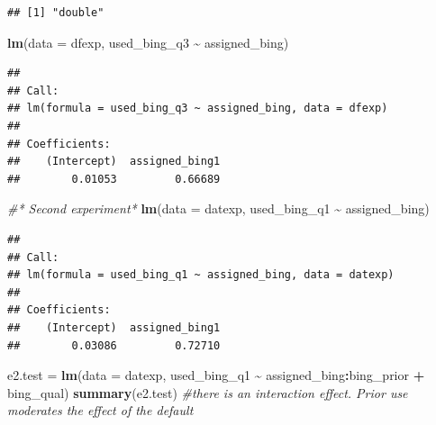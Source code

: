 \documentclass[
  11pt,
]{article}
\newenvironment{Shaded}{\begin{snugshade}}{\end{snugshade}}
\newcommand{\AttributeTok}[1]{\textcolor[rgb]{0.13,0.29,0.53}{#1}}
\newcommand{\CommentTok}[1]{\textcolor[rgb]{0.56,0.35,0.01}{\textit{#1}}}
\newcommand{\FunctionTok}[1]{\textcolor[rgb]{0.13,0.29,0.53}{\textbf{#1}}}
\newcommand{\NormalTok}[1]{#1}
\newcommand{\OtherTok}[1]{\textcolor[rgb]{0.56,0.35,0.01}{#1}}
\newcommand{\SpecialCharTok}[1]{\textcolor[rgb]{0.81,0.36,0.00}{\textbf{#1}}}
\begin{document}
\begin{verbatim}
## [1] "double"
\end{verbatim}

\begin{Shaded}
\begin{Highlighting}[]
\FunctionTok{lm}\NormalTok{(}\AttributeTok{data =}\NormalTok{ dfexp, used\_bing\_q3 }\SpecialCharTok{\textasciitilde{}}\NormalTok{ assigned\_bing)}
\end{Highlighting}
\end{Shaded}

\begin{verbatim}
## 
## Call:
## lm(formula = used_bing_q3 ~ assigned_bing, data = dfexp)
## 
## Coefficients:
##    (Intercept)  assigned_bing1  
##        0.01053         0.66689
\end{verbatim}

\begin{Shaded}
\begin{Highlighting}[]
\CommentTok{\#\textquotesingle{}* Second experiment*}
\FunctionTok{lm}\NormalTok{(}\AttributeTok{data =}\NormalTok{ datexp, used\_bing\_q1 }\SpecialCharTok{\textasciitilde{}}\NormalTok{ assigned\_bing)}
\end{Highlighting}
\end{Shaded}

\begin{verbatim}
## 
## Call:
## lm(formula = used_bing_q1 ~ assigned_bing, data = datexp)
## 
## Coefficients:
##    (Intercept)  assigned_bing1  
##        0.03086         0.72710
\end{verbatim}

\begin{Shaded}
\begin{Highlighting}[]
\NormalTok{e2.test }\OtherTok{=} \FunctionTok{lm}\NormalTok{(}\AttributeTok{data =}\NormalTok{ datexp, used\_bing\_q1 }\SpecialCharTok{\textasciitilde{}}\NormalTok{ assigned\_bing}\SpecialCharTok{:}\NormalTok{bing\_prior }\SpecialCharTok{+}\NormalTok{ bing\_qual)}
\FunctionTok{summary}\NormalTok{(e2.test) }\CommentTok{\#there is an interaction effect. Prior use moderates the effect of the default}
\end{Highlighting}
\end{Shaded}
\end{document}
